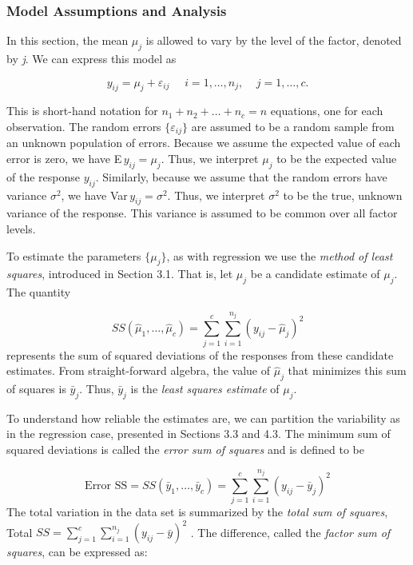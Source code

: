 \subsubsection*{Model Assumptions and Analysis}

In this section, the mean $\mu_j$ is allowed to vary by the level of
the factor, denoted by \textit{j}. We can express this model as

\begin{equation*}
y_{ij}=\mu_{j}+ \varepsilon_{ij}\ \ \ \ \ \ i=1,\ldots ,n_{j},\ \ \
\ \ j=1,\ldots ,c.
\end{equation*}

This is short-hand notation for $n_1+n_2+\ldots +n_{c}=n$ equations,
one for each observation. The random errors $\{ \varepsilon_{ij} \}$
are assumed to be a random sample from an unknown population of
errors. Because we assume the expected value of each error is zero,
we have E$\,y_{ij}=\mu_{j}$. Thus, we interpret $\mu_{j}$ to be the
expected value of the response $y_{ij}$. Similarly, because we
assume that the random errors have variance $\sigma ^{2}$, we have
Var$\,y_{ij}=\sigma ^{2}$. Thus, we interpret $\sigma ^{2}$ to be
the true, unknown variance of the response. This variance is assumed
to be common over all factor levels.

To estimate the parameters $\{\mu_{j}\}$, as with regression we use
the \textit{method of least squares}, introduced in Section 3.1.
That is, let $\hat{\mu}_j$ be a candidate estimate of $\mu_{j}$. The
quantity

\begin{equation*}
SS(\hat{\mu}_1,\ldots
,\hat{\mu}_{c})=\sum_{j=1}^{c}\sum_{i=1}^{n_{j}}(y_{ij}-\hat{\mu}_{j})^{2}
\end{equation*}%
represents the sum of squared deviations of the responses from these
candidate estimates. From straight-forward algebra, the value of
$\hat{\mu}_j$ that minimizes this sum of squares is $\bar{y}_{j}$.
Thus, $\bar{y}_{j}$ is the \textit{least squares estimate }of $\mu
_{j}$.

To understand how reliable the estimates are, we can partition the
variability as in the regression case, presented in Sections 3.3 and 4.3.
The minimum sum of squared deviations is called the \textit{error sum of
squares} and is defined to be

\begin{equation*}
\text{Error SS}=SS(\bar{y}_1,\ldots ,\bar{y}_{c})=\sum_{j=1}^{c}%
\sum_{i=1}^{n_{j}}(y_{ij}-\bar{y}_{j})^{2}
\end{equation*}%
The total variation in the data set is summarized by the \textit{total sum
of squares}, Total $SS=\sum_{j=1}^{c}\sum_{i=1}^{n_{j}}(y_{ij}-\bar{y})^{2}$%
. The difference, called the \textit{factor sum of} \textit{squares}, can be
expressed as:

